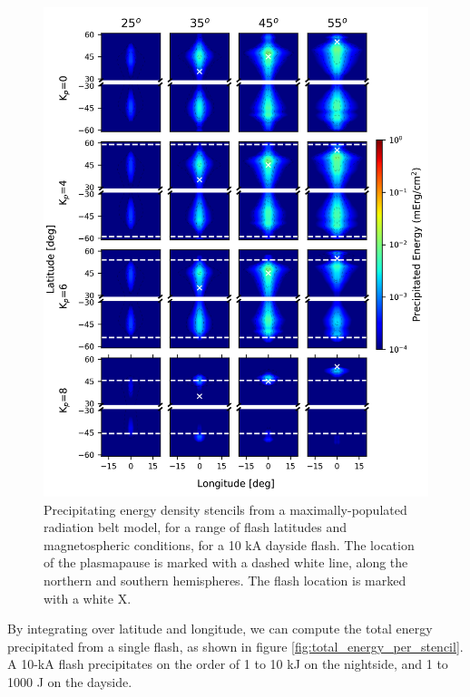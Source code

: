 \begin{figure}[]
\begin{center}
\includegraphics{figures/energy_stencils_dayside_v2.png}
\caption[Precipitating flux density stencils for a range of input latitudes and magnetospheric conditions (dayside)]{Precipitating energy density stencils from a maximally-populated radiation belt model, for a range of flash latitudes and magnetospheric conditions, for a 10 kA dayside flash. The location of the plasmapause is marked with a dashed white line, along the northern and southern hemispheres. The flash location is marked with a white X.}
\label{fig:precip_stencils_day}
\end{center}
\end{figure}

By integrating over latitude and longitude, we can compute the total energy precipitated from a single flash, as shown in figure \ref{fig:total_energy_per_stencil}. A 10-kA flash precipitates on the order of 1 to 10 kJ on the nightside, and 1 to 1000 J on the dayside.

